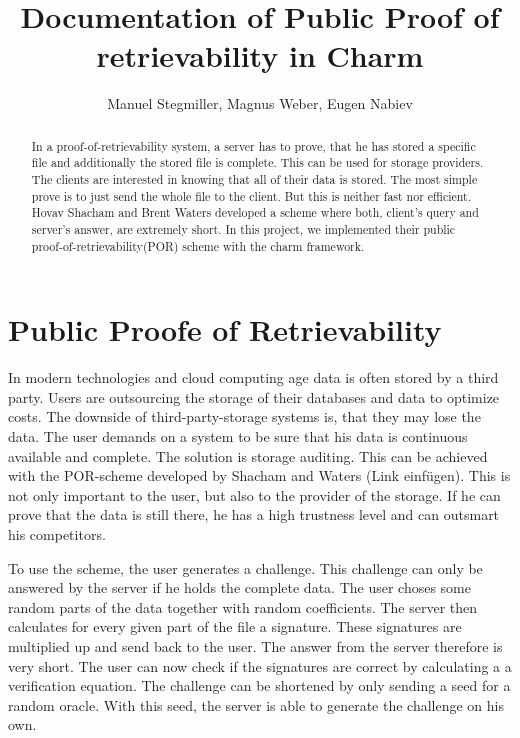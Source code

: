 \documentclass{amsart}
\title{Documentation of Public Proof of retrievability in Charm}
\author{Manuel Stegmiller, Magnus Weber, Eugen Nabiev}
\begin{document}
\begin{abstract}
In a proof-of-retrievability system, a server has to prove, that he has stored a specific file and additionally the stored file is complete. This can be used for storage providers. The clients are interested in knowing that all of their data is stored. The most simple prove is to just send the whole file to the client. But this is neither fast nor efficient. Hovav Shacham and Brent Waters developed a scheme where both, client's query and server's answer, are extremely short. In this project, we implemented their public proof-of-retrievability(POR) scheme with the charm framework.
\end{abstract}
\maketitle
\section{Public Proofe of Retrievability}
In modern technologies and cloud computing age data is often stored by a third party. Users are outsourcing the storage of their databases and data to optimize costs. The downside of third-party-storage systems is, that they may lose the data. The user demands on a system to be sure that his data is continuous available and complete. The solution is storage auditing. This can be achieved with the POR-scheme developed by Shacham and Waters (Link einfügen). This is not only important to the user, but also to the provider of the storage. If he can prove that the data is still there, he has a high trustness level and can outsmart his competitors.

To use the scheme, the user generates a challenge. This challenge can only be answered by the server if he holds the complete data. The user choses some random parts of the data together with random coefficients. The server then calculates for every given part of the file a signature. These signatures are multiplied up and send back to the user. The answer from the server therefore is very short. The user can now check if the signatures are correct by calculating a a verification equation. The challenge can be shortened by only sending a seed for a random oracle. With this seed, the server is able to generate the challenge on his own.
\end{document}
